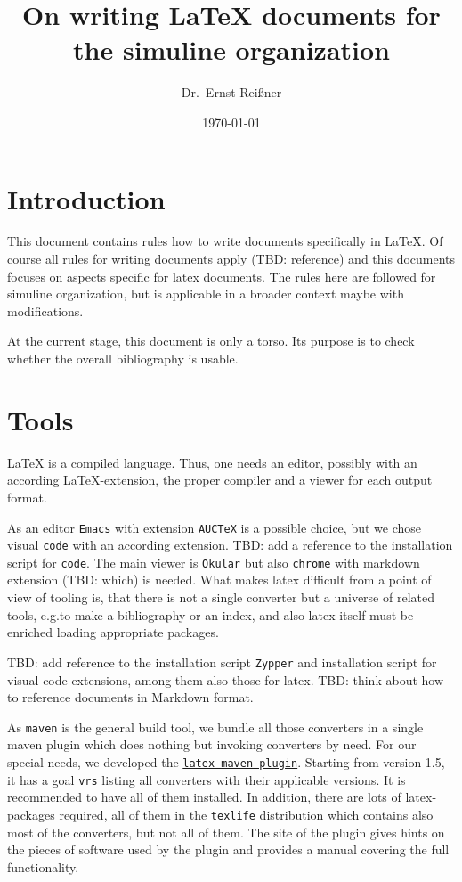 \documentclass[a4paper,12pt]{article}
\title{On writing \LaTeX{} documents for the simuline organization}
\author{Dr.~Ernst Reißner}
\date{\today}
\begin{document}
\maketitle


\newpage

\tableofcontents %
\listoffigures
\listoftables

\section{Introduction}

This document contains rules how to write documents specifically in \LaTeX. 
Of course all rules for writing documents apply (TBD\@: reference) 
and this documents focuses on aspects specific for latex documents. 
The rules here are followed for simuline organization, 
but is applicable in a broader context maybe with modifications. 

At the current stage, this document is only a torso. 
Its purpose is to check whether the overall bibliography is usable. 


\section{Tools}\label{sec:tools}

\LaTeX{} is a compiled language. 
Thus, one needs an editor, possibly with an according \LaTeX-extension, 
the proper compiler and a viewer for each output format. 

As an editor \texttt{Emacs} with extension \texttt{AUCTeX} 
is a possible choice, but we chose visual \texttt{code} with an according extension. 
TBD\@: add a reference to the installation script for \texttt{code}. 
The main viewer is \texttt{Okular} but also \texttt{chrome} with markdown extension (TBD\@: which) 
is needed. 
What makes latex difficult from a point of view of tooling is, 
that there is not a single converter but a universe of related tools, 
e.g.\@ to make a bibliography or an index, 
and also latex itself must be enriched loading appropriate packages. 

TBD\@: add reference to the installation script \texttt{Zypper} 
and installation script for visual code extensions, among them also those for latex. 
TBD\@: think about how to reference documents in Markdown format. 


As \texttt{maven} is the general build tool, we bundle all those converters 
in a single maven plugin which does nothing but invoking converters by need. 
For our special needs, we developed the 
\href{https://github.com/Reissner/latex-maven-plugin}{\texttt{latex-maven-plugin}}. 
Starting from version 1.5, it has a goal \texttt{vrs} listing all converters 
with their applicable versions. 
It is recommended to have all of them installed. 
In addition, there are lots of latex-packages required, 
all of them in the \texttt{texlife} distribution 
which contains also most of the converters, but not all of them. 
The site of the plugin gives hints on the pieces of software used by the plugin 
and provides a manual covering the full functionality. 
\end{document}
